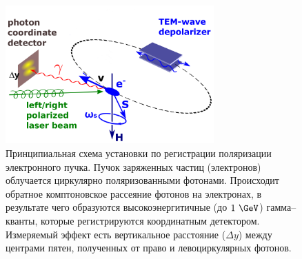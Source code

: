 \begin{figure}[H]
	\begin{center}
		\includegraphics[width = 8cm]{img/mrd-lsrp.png}
		\caption{Принципиальная схема установки по регистрации поляризации электронного пучка. Пучок заряженных частиц (электронов) облучается циркулярно поляризованными фотонами. Происходит обратное комптоновское рассеяние фотонов на электронах, в результате чего образуются высокоэнергитичные (до $1~\GeV$) гамма--кванты, которые регистрируются координатным детектором. Измеряемый эффект есть вертикальное расстояние ($\Delta y$) между центрами пятен, полученных от право и левоциркулярных фотонов.}
		\label{fig:laser_polarimeter_scheme}
	\end{center}
\end{figure}
\vspace{-20pt}
